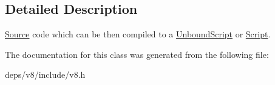 \subsection{Detailed Description}
\hyperlink{classv8_1_1_script_compiler_1_1_source}{Source} code which can be then compiled to a \hyperlink{classv8_1_1_unbound_script}{Unbound\+Script} or \hyperlink{classv8_1_1_script}{Script}. 

The documentation for this class was generated from the following file\+:\begin{DoxyCompactItemize}
\item 
deps/v8/include/v8.\+h\end{DoxyCompactItemize}
